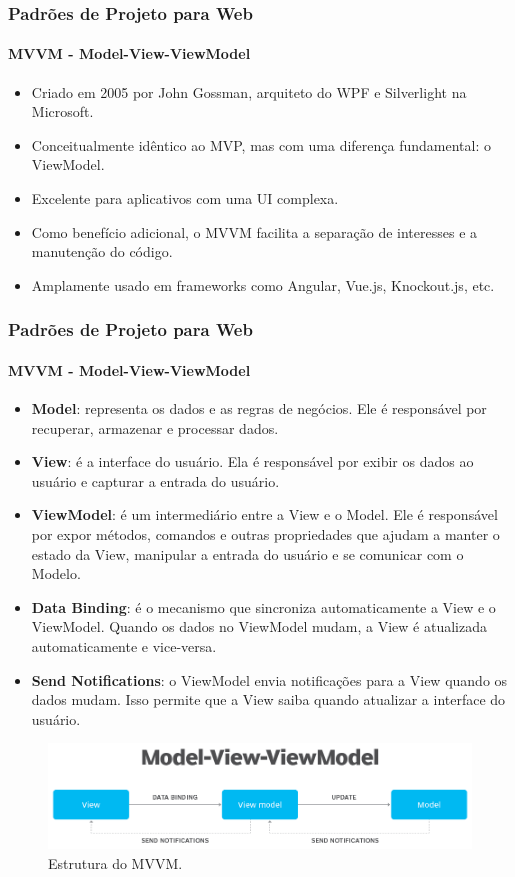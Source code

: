 \documentclass[
	9pt, %
	t, %
]{beamer}
\begin{document}

\begin{frame}
	\frametitle{Padrões de Projeto para Web}
	\framesubtitle{MVVM - Model-View-ViewModel}

	\begin{itemize}
		\item Criado em 2005 por John Gossman, arquiteto do WPF e Silverlight na Microsoft.
		\item Conceitualmente idêntico ao MVP, mas com uma diferença fundamental: o
		      ViewModel.
		\item Excelente para aplicativos com uma UI complexa.
		\item Como benefício adicional, o MVVM facilita a separação de interesses e a
		      manutenção do código.
		\item Amplamente usado em frameworks como Angular, Vue.js, Knockout.js, etc.
	\end{itemize}

\end{frame}

\begin{frame}
	\frametitle{Padrões de Projeto para Web}
	\framesubtitle{MVVM - Model-View-ViewModel}

	{\small
		\begin{itemize}
			\item \textbf{Model}: representa os dados e as regras de negócios. Ele é responsável por recuperar, armazenar e processar dados.
			\item \textbf{View}: é a interface do usuário. Ela é responsável por exibir os dados ao usuário e capturar a entrada do usuário.
			\item \textbf{ViewModel}: é um intermediário entre a View e o Model. Ele é responsável por expor métodos, comandos e outras propriedades que ajudam a manter o estado da View, manipular a entrada do usuário e se comunicar com o Modelo.
			\item \textbf{Data Binding}: é o mecanismo que sincroniza automaticamente a View e o ViewModel. Quando os dados no ViewModel mudam, a View é atualizada automaticamente e vice-versa.
			\item \textbf{Send Notifications}: o ViewModel envia notificações para a View quando os dados mudam. Isso permite que a View saiba quando atualizar a interface do usuário.
		\end{itemize}
	}

	\begin{figure}
		\centering
		\includegraphics[width=0.9\linewidth]{Images/mvvm.png}
		\caption{Estrutura do MVVM.}\label{fig:mvvm}
	\end{figure}

\end{frame}
\end{document}
